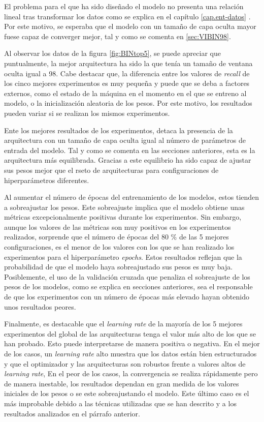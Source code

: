 El problema para el que ha sido diseñado el modelo no presenta una relación lineal tras transformar los datos como se explica en el capítulo \ref{cap.ent-datos} . Por este motivo, se esperaba que el modelo con un tamaño de capa oculta mayor fuese capaz de converger mejor, tal y como se comenta en \ref{sec:VIBIN98}.

Al observar los datos de la figura \ref{fig:BINtop5}, se puede apreciar que puntualmente, la mejor arquitectura ha sido la que tenía un tamaño de ventana oculta igual a 98. Cabe destacar que, la diferencia entre los valores de \textit{recall} de los cinco mejores experimentos es muy pequeña y puede que se deba a factores externos, como el estado de la máquina en el momento en el que se entreno al modelo, o la inicialización aleatoria de los pesos. Por este motivo, los resultados pueden variar si se realizan los mismos experimentos.

Ente los mejores resultados de los experimentos, detaca la presencia de la arquitectura con un tamaño de capa oculta igual al número de parámetros de entrada del modelo. Tal y como se comenta en las secciones anteriores, esta es la arquitectura más equilibrada. Gracias a este equilibrio ha sido capaz de ajustar sus pesos mejor que el rseto de arquitecturas para configuraciones de hiperparámetros diferentes.

Al aumentar el número de épocas del entrenamiento de los modelos, estos tienden a sobreajustar los pesos. Este sobreajuste implica que el modelo obtiene unas métricas excepcionalmente positivas durante los experimentos. Sin embargo, aunque los valores de las métricas son muy positivos en los experimentos realizados, sorprende que el número de épocas del 80 \% de las 5 mejores configuraciones, es el menor de los valores con los que se han realizado los experimentos para el hiperparámetro \textit{epochs}. Estos resultados reflejan que la probabilidad de que el modelo haya sobreajustado sus pesos es muy baja. Posiblemente, el uso de la validación cruzada que penaliza el sobreajuste de los pesos de los modelos, como se explica en secciones anteriores, sea el responsable de que los experimentos con un número de épocas más elevado hayan obtenido unos resultados peores.

Finalmente, es destacable que el \textit{learning rate} de la mayoría de los 5 mejores experimentos del global de las arquitecturas tenga el valor más alto de los que se han probado. Esto puede interpretarse de manera positiva o negativa.
En el mejor de los casos, un \textit{learning rate} alto muestra que los datos están bien estructurados y que el optimizador y las arquitecturas son robustos frente a valores altos de \textit{learning rate},
En el peor de los casos, la convergencia se realiza rápidamente pero de manera inestable, los resultados dependan en gran medida de los valores iniciales de los pesos o se este sobreajustando el modelo. Este último caso es el más improbable debido a las técnicas utilizadas que se han descrito y a los resultados analizados en el párrafo anterior.


